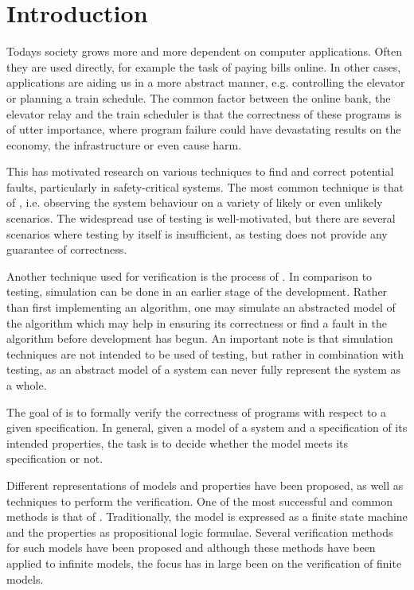 \newpage
\section{Introduction}
Todays society grows more and more dependent on computer applications. Often they are used directly, for example the task of paying bills online. In other cases, applications are aiding us in a more abstract manner, e.g. controlling the elevator or planning a train schedule. The common factor between the online bank, the elevator relay and the train scheduler is that the correctness of these programs is of utter importance, where program failure could have devastating results on the economy, the infrastructure or even cause harm.

This has motivated research on various techniques to find and correct potential faults, particularly in safety-critical systems. The most common technique is that of , i.e. observing the system behaviour on a variety of likely or even unlikely scenarios. The widespread use of testing is well-motivated, but there are several scenarios where testing by itself is insufficient, as testing does not provide any guarantee of correctness.

Another technique used for verification is the process of . In comparison to testing, simulation can be done in an earlier stage of the development. Rather than first implementing an algorithm, one may simulate an abstracted model of the algorithm which may help in ensuring its correctness or find a fault in the algorithm before development has begun. An important note is that simulation techniques are not intended to be used  of testing, but rather in combination with testing, as an abstract model of a system can never fully represent the system as a whole.

The goal of  is to formally verify the correctness of programs with respect  to a given specification. In general, given a model of a system and a specification of its intended properties, the task is to decide whether the model meets its specification or not.

Different representations of models and properties have been proposed, as well as techniques to perform the verification. One of the most successful and common methods is that of . Traditionally, the model is expressed as a finite state machine and the properties as propositional logic formulae. Several verification methods for such models have been proposed\cite{mcmillan1993symbolic} and although these methods have been applied to infinite models\cite{705644}, the focus has in large been on the verification of finite models.


